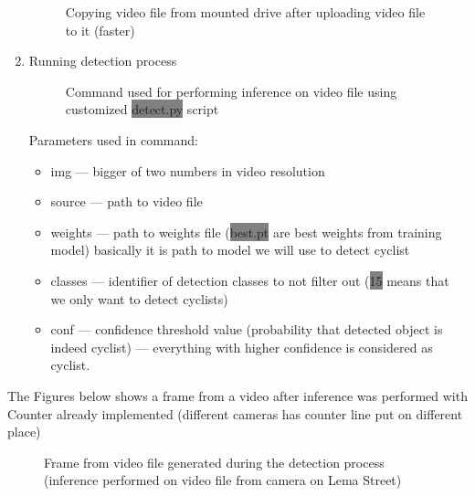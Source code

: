 \begin{enumerate}
\begin{figure} [h]
        \caption{Copying video file from mounted drive after uploading video file to it (faster)}
        \label{fig:inference3}
    \end{figure}
    \item Running detection process
    \newline \begin{figure} [h]
        \centering
        \caption{Command used for performing inference on video file using customized \colorbox{Gray}{detect.py} script}
        \label{fig:inference4}
    \end{figure}
    \newline Parameters used in command:
    \begin{itemize}
        \item img --- bigger of two numbers in video resolution
        \item source --- path to video file
        \item weights --- path to weights file (\colorbox{Gray}{best.pt} are best weights from training model) basically it is path to model we will use to detect cyclist
        \item classes --- identifier of detection classes to not filter out (\colorbox{Gray}{15} means that we only want to detect cyclists)
        \item conf --- confidence threshold value (probability that detected object is indeed cyclist) --- everything with higher confidence is considered as cyclist.
    \end{itemize}
\end{enumerate}
The Figures below shows a frame from a video after inference was performed with Counter already implemented (different cameras has counter line put on different place)
\begin{figure} [H]
    \centering
    \caption{Frame from video file generated during the detection process (inference performed on video file from camera on Lema Street)}
    \label{fig:inference}
\end{figure}
